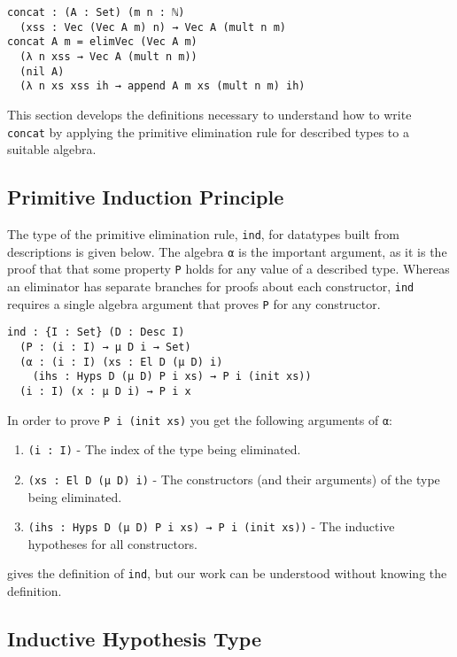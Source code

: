 \documentclass[preprint,nonatbib]{sigplanconf}
\begin{document}
\begin{verbatim}
concat : (A : Set) (m n : ℕ)
  (xss : Vec (Vec A m) n) → Vec A (mult n m)
concat A m = elimVec (Vec A m)
  (λ n xss → Vec A (mult n m))
  (nil A)
  (λ n xs xss ih → append A m xs (mult n m) ih)
\end{verbatim}

This section develops the definitions necessary to understand how to
write {\tt concat} by applying the primitive elimination rule for
described types to a suitable algebra.

\subsection{Primitive Induction Principle}

The type of the primitive elimination rule, {\tt ind}, for datatypes built from
descriptions is given below.
The algebra {\tt α} is the important argument, as it is the proof that
that some property {\tt P} holds for any value of a
described type.
Whereas an eliminator
has separate branches for proofs about each constructor, {\tt ind}
requires a single algebra argument that proves {\tt P} for any
constructor.

\begin{verbatim}
ind : {I : Set} (D : Desc I)
  (P : (i : I) → μ D i → Set)
  (α : (i : I) (xs : El D (μ D) i)
    (ihs : Hyps D (μ D) P i xs) → P i (init xs))
  (i : I) (x : μ D i) → P i x
\end{verbatim}

In order to prove {\tt P i (init xs)} you get the following
arguments of \verb+α+:

\begin{enumerate}
\item{{\tt (i : I)}} - The index of the type being eliminated.
\item{{\tt (xs : El D (μ D) i)}} - The constructors (and their arguments) of the type
  being eliminated.
\item{{\tt (ihs : Hyps D (μ D) P i xs) → P i (init xs))}} - The inductive
  hypotheses for all constructors.
\end{enumerate}

\citet{mcbride2010ornamental} gives the definition of {\tt ind}, but
our work can be understood without knowing the definition.

\subsection{Inductive Hypothesis Type}
\end{document}
